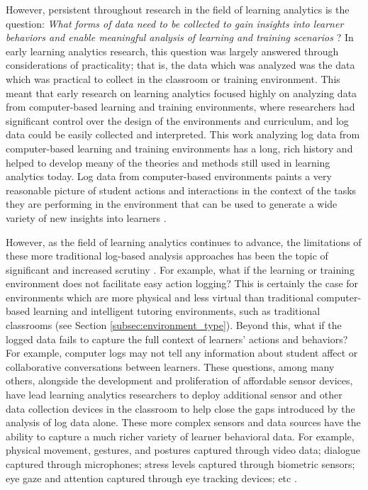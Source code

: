 \documentclass[manuscript,screen,review]{acmart}
\begin{document}
However, persistent throughout research in the field of learning analytics is the question: \textit{What forms of data need to be collected to gain insights into learner behaviors and enable meaningful analysis of learning and training scenarios} \cite{vatral2022using, ochoa2017multimodal}? In early learning analytics research, this question was largely answered through considerations of practicality; that is, the data which was analyzed was the data which was practical to collect in the classroom or training environment. This meant that early research on learning analytics focused highly on analyzing data from computer-based learning and training environments, where researchers had significant control over the design of the environments and curriculum, and log data could be easily collected and interpreted. This work analyzing log data from computer-based learning and training environments has a long, rich history and helped to develop meany of the theories and methods still used in learning analytics today. Log data from computer-based environments paints a very reasonable picture of student actions and interactions in the context of the tasks they are performing in the environment that can be used to generate a wide variety of new insights into learners \cite{hoppe2017computational, ochoa2017multimodal}. 

However, as the field of learning analytics continues to advance, the limitations of these more traditional log-based analysis approaches has been the topic of significant and increased scrutiny \cite{ochoa2017multimodal}. For example, what if the learning or training environment does not facilitate easy action logging? This is certainly the case for environments which are more physical and less virtual than traditional computer-based learning and intelligent tutoring environments, such as traditional classrooms (see Section \ref{subsec:environment_type}). Beyond this, what if the logged data fails to capture the full context of learners' actions and behaviors? For example, computer logs may not tell any information about student affect or collaborative conversations between learners. These questions, among many others, alongside the development and proliferation of affordable sensor devices, have lead learning analytics researchers to deploy additional sensor and other data collection devices in the classroom to help close the gaps introduced by the analysis of log data alone. These more complex sensors and data sources have the ability to capture a much richer variety of learner behavioral data. For example, physical movement, gestures, and postures captured through video data; dialogue captured through microphones; stress levels captured through biometric sensors; eye gaze and attention captured through eye tracking devices; etc \cite{vatral2022using}. 
\end{document}
